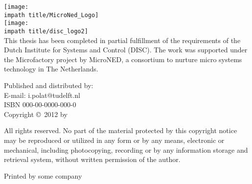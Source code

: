 
\noindent

\texttt{[image: \\impath title/MicroNed\_Logo]}\hspace*{0.75cm}\\[2em]

\texttt{[image: \\impath title/disc\_logo2]}\hspace*{0.75cm}\\[1em]

\noindent This thesis has been completed in partial fulfillment of
the requirements of the Dutch Institute for Systems and Control
(DISC). The work was supported under the Microfactory project by
MicroNED, a consortium to nurture micro systems technology in
The Netherlands.

\vspace*{\fill}


\noindent Published and distributed by: \theauthor \\
E-mail: i.polat@tudelft.nl\\

\bigskip{}
\noindent ISBN 000-00-0000-000-0\\
\noindent Copyright \copyright~2012 by \theauthor



\bigskip{}
\noindent All rights reserved. No part of the material protected by
this copyright notice may be reproduced or utilized in any form or
by any means, electronic or mechanical, including photocopying,
recording or by any information storage and retrieval system,
without written permission of the author.

\bigskip{}

\noindent Printed by some company
